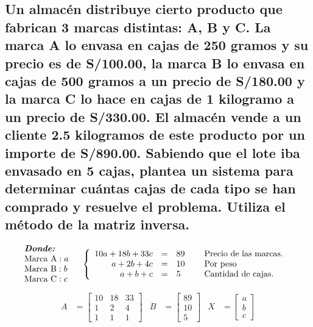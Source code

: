 \documentclass[10pt, a4paper]{article}
\begin{document}
\subsection{Un almacén distribuye cierto producto que fabrican 3 marcas distintas: A, B y C. La marca A lo envasa en cajas de 250 gramos y su precio es de S/100.00, la marca B lo envasa en cajas de 500 gramos a un precio de S/180.00 y la marca C lo hace en cajas de 1 kilogramo a un precio de S/330.00. El almacén vende a un cliente 2.5 kilogramos de este producto por un importe de S/890.00. Sabiendo que el lote iba envasado en 5 cajas, plantea un sistema para determinar cuántas cajas de cada tipo se han comprado y resuelve el problema. Utiliza el método de la matriz inversa.}
\begin{align*}
  &\begin{array}{l}
      \textit{\textbf{Donde:}}\\
      \text{Marca A}: a\\
      \text{Marca B}: b\\
      \text{Marca C}: c\\
  \end{array}
  \quad
  \left\{
  \begin{array}{rcl}
    10a + 18b + 33c &= &89\\
    a + 2b + 4c &= &10\\
    a + b + c &= &5
  \end{array}
  \right.
  \quad
  \begin{array}{l}
    \text{Precio de las marcas.}\\
    \text{Por peso}\\
    \text{Cantidad de cajas.}
  \end{array}
\end{align*}
\begin{align*}
  A &= \begin{bmatrix}
    10 & 18 & 33\\
    1 & 2 & 4\\
    1 & 1 & 1
  \end{bmatrix}&
  B &= \begin{bmatrix}
    89\\
    10\\
    5
  \end{bmatrix}&
  X &= \begin{bmatrix}
    a\\
    b\\
    c
  \end{bmatrix}
\end{align*}
\end{document}
